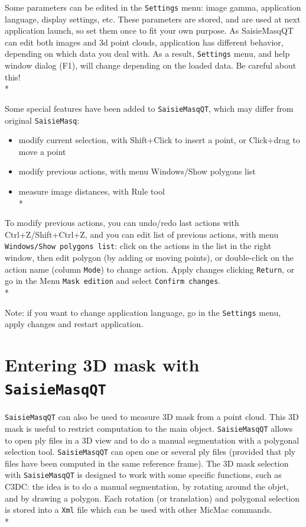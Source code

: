 Some parameters can be edited in the {\tt Settings} menu: image gamma, application language, display settings, etc. These parameters are stored, and are used at next application launch, so set them once to fit your own purpose. As SaisieMasqQT can edit both images and 3d point clouds, application has different behavior, depending on which data you deal with. As a result, {\tt Settings} menu, and help window dialog (F1), will change depending on the loaded data. Be careful about this!\\*

Some special features have been added to {\tt SaisieMasqQT}, which may differ from original {\tt SaisieMasq}: 
\begin{itemize}
\item modify current selection, with Shift+Click to insert a point, or Click+drag to move a point
\item modify previous actions, with menu Windows/Show polygons list 
\item measure image distances, with Rule tool\\*
\end{itemize}

To modify previous actions, you can undo/redo last actions with Ctrl+Z/Shift+Ctrl+Z, and you can edit list of previous actions, with menu {\tt Windows/Show polygons list}: click on the actions in the list in the right window, then edit polygon (by adding or moving points), or double-click on the action name (column {\tt Mode}) to change action. Apply changes clicking {\tt Return}, or go in the Menu {\tt Mask edition} and select {\tt Confirm changes}.\\*

Note: if you want to change application language, go in the {\tt Settings} menu, apply changes and restart application.

\section{Entering 3D mask with {\tt SaisieMasqQT} }

{\tt SaisieMasqQT} can also be used to measure 3D mask from a point cloud. This 3D mask is useful to restrict computation to the main object.
{\tt SaisieMasqQT} allows to open ply files in a 3D view and to do a manual segmentation with a polygonal selection tool.
{\tt SaisieMasqQT} can open one or several ply files (provided that ply files have been computed in the same reference frame).
The 3D mask selection with {\tt SaisieMasqQT} is designed to work with some specific functions, such as C3DC: the idea is to do a manual segmentation,
by rotating around the objet, and by drawing a polygon.
Each rotation (or translation) and polygonal selection is stored into a {\tt Xml} file which can be used with other MicMac commands.\\*

